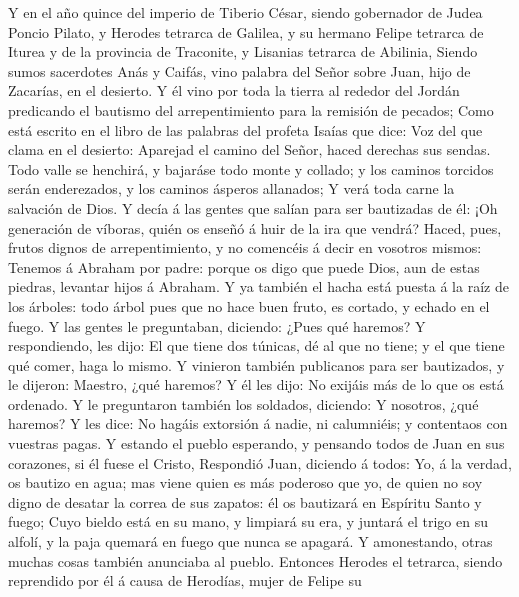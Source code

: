  Y en el año quince del imperio de Tiberio César, siendo
gobernador de Judea Poncio Pilato, y Herodes tetrarca de Galilea, y su
hermano Felipe tetrarca de Iturea y de la provincia de Traconite, y
Lisanias tetrarca de Abilinia,  Siendo sumos sacerdotes
Anás y Caifás, vino palabra del Señor sobre Juan, hijo de Zacarías, en
el desierto.  Y él vino por toda la tierra al rededor del
Jordán predicando el bautismo del arrepentimiento para la remisión de
pecados;  Como está escrito en el libro de las palabras
del profeta Isaías que dice: Voz del que clama en el desierto: Aparejad
el camino del Señor, haced derechas sus sendas.  Todo
valle se henchirá, y bajaráse todo monte y collado; y los caminos
torcidos serán enderezados, y los caminos ásperos allanados;
 Y verá toda carne la salvación de Dios.  Y
decía á las gentes que salían para ser bautizadas de él: ¡Oh generación
de víboras, quién os enseñó á huir de la ira que vendrá? 
Haced, pues, frutos dignos de arrepentimiento, y no comencéis á decir en
vosotros mismos: Tenemos á Abraham por padre: porque os digo que puede
Dios, aun de estas piedras, levantar hijos á Abraham.  Y
ya también el hacha está puesta á la raíz de los árboles: todo árbol
pues que no hace buen fruto, es cortado, y echado en el fuego.
 Y las gentes le preguntaban, diciendo: ¿Pues qué
haremos?  Y respondiendo, les dijo: El que tiene dos
túnicas, dé al que no tiene; y el que tiene qué comer, haga lo mismo.
 Y vinieron también publicanos para ser bautizados, y le
dijeron: Maestro, ¿qué haremos?  Y él les dijo: No
exijáis más de lo que os está ordenado.  Y le preguntaron
también los soldados, diciendo: Y nosotros, ¿qué haremos? Y les dice: No
hagáis extorsión á nadie, ni calumniéis; y contentaos con vuestras
pagas.  Y estando el pueblo esperando, y pensando todos
de Juan en sus corazones, si él fuese el Cristo, 
Respondió Juan, diciendo á todos: Yo, á la verdad, os bautizo en agua;
mas viene quien es más poderoso que yo, de quien no soy digno de desatar
la correa de sus zapatos: él os bautizará en Espíritu Santo y fuego;
 Cuyo bieldo está en su mano, y limpiará su era, y
juntará el trigo en su alfolí, y la paja quemará en fuego que nunca se
apagará.  Y amonestando, otras muchas cosas también
anunciaba al pueblo.  Entonces Herodes el tetrarca,
siendo reprendido por él á causa de Herodías, mujer de Felipe su
